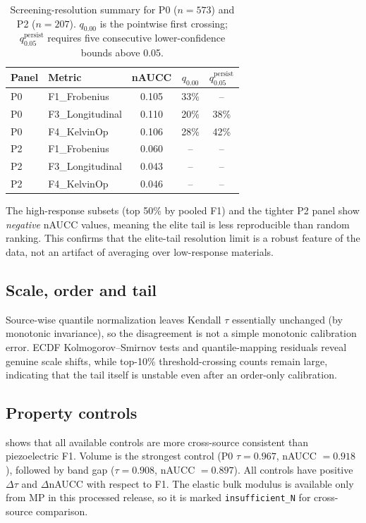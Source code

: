 \documentclass[11pt]{article}
\begin{document}
\begin{table}[htbp]
\centering
\caption{Screening-resolution summary for P0 ($n=573$) and P2 ($n=207$). $q_{0.00}$ is the pointwise first crossing; $q_{0.05}^{\mathrm{persist}}$ requires five consecutive lower-confidence bounds above 0.05.}
\label{tab:concordance}
\begin{tabular}{llccc}
\toprule
Panel & Metric & nAUCC & $q_{0.00}$ & $q_{0.05}^{\mathrm{persist}}$ \\
\midrule
P0 & F1\_Frobenius & 0.105 & 33\% & -- \\
P0 & F3\_Longitudinal & 0.110 & 20\% & 38\% \\
P0 & F4\_KelvinOp & 0.106 & 28\% & 42\% \\
P2 & F1\_Frobenius & 0.060 & -- & -- \\
P2 & F3\_Longitudinal & 0.043 & -- & -- \\
P2 & F4\_KelvinOp & 0.046 & -- & -- \\
\bottomrule
\end{tabular}
\end{table}

The high-response subsets (top 50\% by pooled F1) and the tighter P2 panel show \emph{negative} nAUCC values, meaning the elite tail is less reproducible than random ranking.
This confirms that the elite-tail resolution limit is a robust feature of the data, not an artifact of averaging over low-response materials.

\subsection{Scale, order and tail}
Source-wise quantile normalization leaves Kendall $\tau$ essentially unchanged (by monotonic invariance), so the disagreement is not a simple monotonic calibration error.
ECDF Kolmogorov--Smirnov tests and quantile-mapping residuals reveal genuine scale shifts, while top-10\% threshold-crossing counts remain large, indicating that the tail itself is unstable even after an order-only calibration.

\subsection{Property controls}
 shows that all available controls are more cross-source consistent than piezoelectric F1.
Volume is the strongest control (P0 $\tau=0.967$, nAUCC $=0.918$), followed by band gap ($\tau=0.908$, nAUCC $=0.897$).
All controls have positive $\Delta\tau$ and $\Delta$nAUCC with respect to F1.
The elastic bulk modulus is available only from MP in this processed release, so it is marked \texttt{insufficient\_N} for cross-source comparison.
\end{document}
